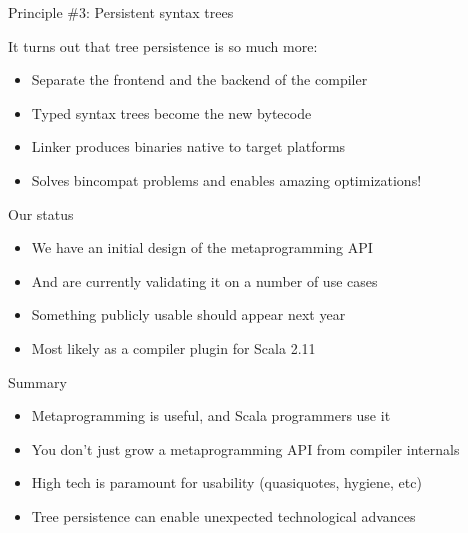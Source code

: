 \documentclass[svgnames,dvipsnames,hyperref={bookmarks=false},usepdftitle=false]{beamer}
\begin{document}
\begin{frame}{Principle \#3: Persistent syntax trees}

It turns out that tree persistence is so much more:
\begin{itemize}
\item Separate the frontend and the backend of the compiler
\item Typed syntax trees become the new bytecode
\item Linker produces binaries native to target platforms
\item Solves bincompat problems and enables amazing optimizations!
\end{itemize}

\end{frame}

\begin{frame}{Our status}
\begin{itemize}
\item We have an initial design of the metaprogramming API
\item And are currently validating it on a number of use cases
\item Something publicly usable should appear next year
\item Most likely as a compiler plugin for Scala 2.11
\end{itemize}
\end{frame}


\begin{frame}{Summary}

\begin{itemize}
\item Metaprogramming is useful, and Scala programmers use it
\item You don't just grow a metaprogramming API from compiler internals
\item High tech is paramount for usability (quasiquotes, hygiene, etc)
\item Tree persistence can enable unexpected technological advances
\end{itemize}

\end{frame}
\end{document}
